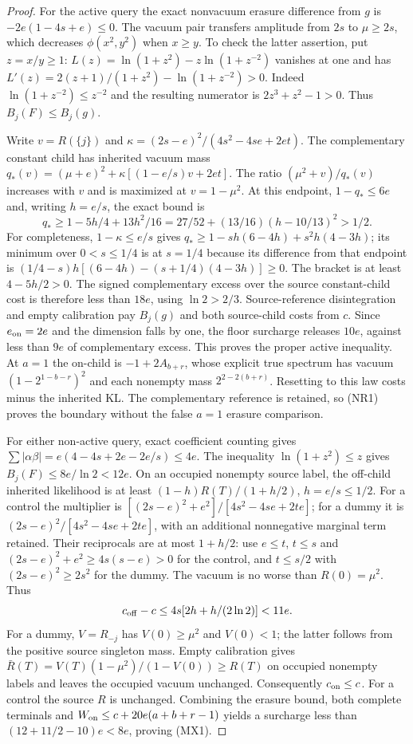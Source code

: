 \documentclass[11pt]{article}
\begin{document}
\begin{proof}
For the active query the exact nonvacuum erasure difference from
$g$ is $-2e(1-4s+e)\le0$. The vacuum pair transfers amplitude
from $2s$ to $\mu\ge2s$, which decreases
$\phi(x^2,y^2)$ when $x\ge y$. To check the latter assertion,
put $z=x/y\ge1$: $L(z)=\ln(1+z^2)-z\ln(1+z^{-2})$ vanishes
at one and has
$L'(z)=2(z+1)/(1+z^2)-\ln(1+z^{-2})>0$.
Indeed $\ln(1+z^{-2})\le z^{-2}$ and the resulting numerator
is $2z^3+z^2-1>0$. Thus $B_j(F)\le B_j(g)$.

Write $v=R(\{j\})$ and
$\kappa=(2s-e)^2/(4s^2-4se+2et)$. The complementary constant
child has inherited vacuum mass
$q_*(v)=(\mu+e)^2+\kappa[(1-e/s)v+2et]$.
The ratio $(\mu^2+v)/q_*(v)$ increases with $v$ and is maximized
at $v=1-\mu^2$. At this endpoint, $1-q_*\le6e$ and, writing
$h=e/s$, the exact bound is
\[
 q_*\ge1-5h/4+13h^2/16
       =27/52+(13/16)(h-10/13)^2>1/2.
\]
For completeness, $1-\kappa\le e/s$ gives
$q_*\ge1-sh(6-4h)+s^2h(4-3h)$; its minimum over
$0<s\le1/4$ is at $s=1/4$ because its difference from that
endpoint is $(1/4-s)h[(6-4h)-(s+1/4)(4-3h)]\ge0$.
The bracket is at least $4-5h/2>0$. The signed complementary
excess over the source constant-child cost is therefore less
than $18e$, using $\ln2>2/3$. Source-reference disintegration and
empty calibration pay $B_j(g)$ and both source-child costs from
$c$. Since $e_{\rm on}=2e$ and the dimension falls by one,
the floor surcharge releases $10e$, against less than $9e$ of
complementary excess. This proves the proper active inequality.
At $a=1$ the on-child is $-1+2A_{b+r}$, whose explicit true
spectrum has vacuum $(1-2^{1-b-r})^2$ and each nonempty mass
$2^{2-2(b+r)}$. Resetting to this law costs minus the inherited
KL. The complementary reference is retained, so (NR1) proves
the boundary without the false $a=1$ erasure comparison.

For either non-active query, exact coefficient counting gives
$\sum|\alpha\beta|=e(4-4s+2e-2e/s)\le4e$.
The inequality $\ln(1+z^2)\le z$ gives
$B_j(F)\le8e/\ln2<12e$. On an occupied nonempty source
label, the off-child inherited likelihood is at least
$(1-h)R(T)/(1+h/2)$, $h=e/s\le1/2$.
For a control the multiplier is
$[(2s-e)^2+e^2]/[4s^2-4se+2te]$; for a dummy it is
$(2s-e)^2/[4s^2-4se+2te]$, with an additional nonnegative
marginal term retained. Their reciprocals are at most $1+h/2$:
use $e\le t$, $t\le s$ and
$(2s-e)^2+e^2\ge4s(s-e)>0$ for the control, and
$t\le s/2$ with $(2s-e)^2\ge2s^2$ for the dummy.
The vacuum is no worse than $R(0)=\mu^2$. Thus
\[
 c_{\rm off}-c\le4s[2h+h/(2\ln2)]<11e.
\]
For a dummy, $V=R_{-j}$ has $V(0)\ge\mu^2$ and $V(0)<1$;
the latter follows from the positive source singleton mass.
Empty calibration gives
$\bar R(T)=V(T)(1-\mu^2)/(1-V(0))\ge R(T)$ on occupied
nonempty labels and leaves the occupied vacuum unchanged.
Consequently $c_{\rm on}\le c$. For a control the source $R$
is unchanged. Combining the erasure bound, both complete
terminals and $W_{\rm on}\le c+20e(a+b+r-1)$ yields a surcharge
less than $(12+11/2-10)e<8e$, proving (MX1).
\end{proof}
\end{document}
